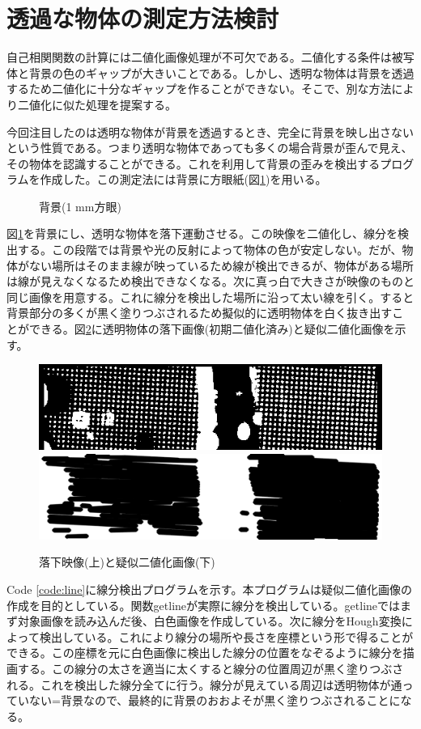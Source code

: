 \documentclass[a4paper,10pt,twocolumn,dvipdfmx]{jsarticle}
\begin{document}
\section{透過な物体の測定方法検討}
自己相関関数の計算には二値化画像処理が不可欠である。二値化する条件は被写体と背景の色のギャップが大きいことである。しかし、透明な物体は背景を透過するため二値化に十分なギャップを作ることができない。そこで、別な方法により二値化に似た処理を提案する。 \par
今回注目したのは透明な物体が背景を透過するとき、完全に背景を映し出さないという性質である。つまり透明な物体であっても多くの場合背景が歪んで見え、その物体を認識することができる。これを利用して背景の歪みを検出するプログラムを作成した。この測定法には背景に方眼紙(図\ref{fig:block})を用いる。
\begin{figure}[H]
	\caption{背景(1 mm方眼)}
	\label{fig:block}
\end{figure}
図\ref{fig:block}を背景にし、透明な物体を落下運動させる。この映像を二値化し、線分を検出する。この段階では背景や光の反射によって物体の色が安定しない。だが、物体がない場所はそのまま線が映っているため線が検出できるが、物体がある場所は線が見えなくなるため検出できなくなる。次に真っ白で大きさが映像のものと同じ画像を用意する。これに線分を検出した場所に沿って太い線を引く。すると背景部分の多くが黒く塗りつぶされるため擬似的に透明物体を白く抜き出すことができる。図\ref{fig:line}に透明物体の落下画像(初期二値化済み)と疑似二値化画像を示す。
\begin{figure}[H]
	\includegraphics[scale=0.4]{water_two.png}
	\includegraphics[scale=0.4]{water_line.png}
	\caption{落下映像(上)と疑似二値化画像(下)}
	\label{fig:line}
\end{figure}
Code \ref{code:line}に線分検出プログラムを示す。本プログラムは疑似二値化画像の作成を目的としている。関数getlineが実際に線分を検出している。getlineではまず対象画像を読み込んだ後、白色画像を作成している。次に線分をHough変換によって検出している。これにより線分の場所や長さを座標という形で得ることができる。この座標を元に白色画像に検出した線分の位置をなぞるように線分を描画する。この線分の太さを適当に太くすると線分の位置周辺が黒く塗りつぶされる。これを検出した線分全てに行う。線分が見えている周辺は透明物体が通っていない=背景なので、最終的に背景のおおよそが黒く塗りつぶされることになる。

\end{document}

